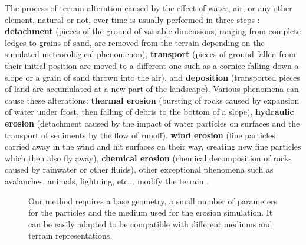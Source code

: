 The process of terrain alteration caused by the effect of water, air, or any other element, natural or not, over time is usually performed in three steps \cite{Neidhold2005}: \textbf{detachment} (pieces of the ground of variable dimensions, ranging from complete ledges to grains of sand, are removed from the terrain depending on the simulated meteorological phenomenon), \textbf{transport} (pieces of ground fallen from their initial position are moved to a different one such as a cornice falling down a slope or a grain of sand thrown into the air), and \textbf{deposition} (transported pieces of land are accumulated at a new part of the landscape). Various phenomena can cause these alterations: \textbf{thermal erosion} (bursting of rocks caused by expansion of water under frost, then falling of debris to the bottom of a slope), \textbf{hydraulic erosion} (detachment caused by the impact of water particles on surfaces and the transport of sediments by the flow of runoff), \textbf{wind erosion} (fine particles carried away in the wind and hit surfaces on their way, creating new fine particles which then also fly away), \textbf{chemical erosion} (chemical decomposition of rocks caused by rainwater or other fluids), other exceptional phenomena such as avalanches, animals, lightning, etc... modify the terrain \cite{Cordonnier2017a, Argudo2020, Cordonnier2018, Cordonnier2017b,Cordonnier2023}.

\begin{figure*}
\centering
{}
\caption{Our method requires a base geometry, a small number of parameters for the particles and the medium used for the erosion simulation. It can be easily adapted to be compatible with different mediums and terrain representations.}
\label{fig:erosion-pipeline}
\end{figure*}


